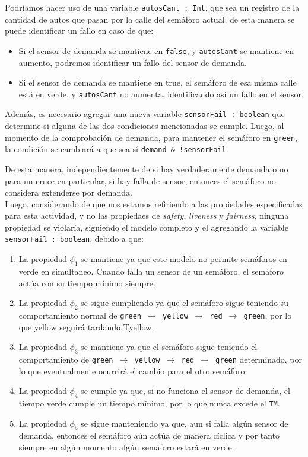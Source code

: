 Podríamos hacer uso de una variable \texttt{autosCant : Int}, que sea un registro de la cantidad de autos que pasan por la calle del semáforo actual; de esta manera se puede identificar un fallo en caso de que:

\begin{itemize}
    \item Si el sensor de demanda se mantiene en \texttt{false}, y \texttt{autosCant} se mantiene en aumento, podremos identificar un fallo del sensor de demanda.
    \item Si el sensor de demanda se mantiene en true, el semáforo de esa misma calle está en verde, y \texttt{autosCant} no aumenta, identificando así un fallo en el sensor.
\end{itemize}

Además, es necesario agregar una nueva variable \texttt{sensorFail : boolean} que determine si alguna de las dos condiciones mencionadas se cumple. Luego, al momento de la comprobación de demanda, para mantener el semáforo en \texttt{green}, la condición se cambiará a que sea sí \texttt{demand \& !sensorFail}.

De esta manera, independientemente de si hay verdaderamente demanda o no para un cruce en particular, si hay falla de sensor, entonces el semáforo no considera extenderse por demanda.\\

Luego, considerando de que nos estamos refiriendo a las propiedades especificadas para esta actividad, y no las propiedaes de \textit{safety}, \textit{liveness} y \textit{fairness}, ninguna propiedad se violaría, siguiendo el modelo completo y el agregando la variable \texttt{sensorFail : boolean}, debido a que:

\begin{enumerate}
    \item La propiedad $\phi_1$ se mantiene ya que este modelo no permite semáforos en verde en simultáneo. Cuando falla un sensor de un semáforo, el semáforo actúa con su tiempo mínimo siempre.
    \item La propiedad $\phi_2$ se sigue cumpliendo ya que el semáforo sigue teniendo su comportamiento normal de \texttt{green $\rightarrow$ yellow $\rightarrow$ red $\rightarrow$ green}, por lo que yellow seguirá tardando Tyellow.
    \item La propiedad $\phi_3$ se mantiene ya que el semáforo sigue teniendo el comportamiento de \texttt{green $\rightarrow$ yellow $\rightarrow$ red $\rightarrow$ green} determinado, por lo que eventualmente ocurrirá el cambio para el otro semáforo.
    \item La propiedad $\phi_4$ se cumple ya que, si no funciona el sensor de demanda, el tiempo verde cumple un tiempo mínimo, por lo que nunca excede el \texttt{TM}.
    \item La propiedad $\phi_5$ se sigue manteniendo ya que, aun si falla algún sensor de demanda, entonces el semáforo aún actúa de manera cíclica y por tanto siempre en algún momento algún semáforo estará en verde.
\end{enumerate}

